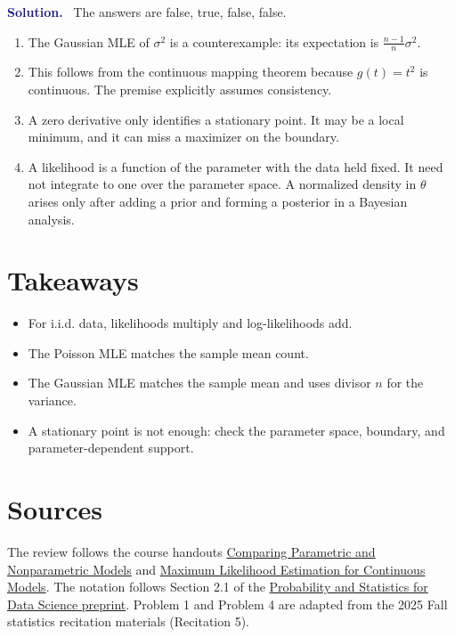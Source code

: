 \documentclass[11pt]{article}
\newenvironment{answer}{%
    \par\medskip\noindent\textcolor{MidnightBlue}{\textbf{Solution.}}\ }
    {\par\medskip}
\begin{document}
\begin{answer}
The answers are false, true, false, false.
\begin{enumerate}[label=(\alph*),itemsep=0.35em]
  \item The Gaussian MLE of $\sigma^2$ is a counterexample: its expectation is
        $\frac{n-1}{n}\sigma^2$.
  \item This follows from the continuous mapping theorem because
        $g(t)=t^2$ is continuous. The premise explicitly assumes consistency.
  \item A zero derivative only identifies a stationary point. It may be a
        local minimum, and it can miss a maximizer on the boundary.
  \item A likelihood is a function of the parameter with the data held fixed.
        It need not integrate to one over the parameter space. A normalized
        density in $\theta$ arises only after adding a prior and forming a
        posterior in a Bayesian analysis.
\end{enumerate}
\end{answer}

\section*{Takeaways}
\begin{itemize}[leftmargin=1.6em,itemsep=0.25em]
  \item For i.i.d. data, likelihoods multiply and log-likelihoods add.
  \item The Poisson MLE matches the sample mean count.
  \item The Gaussian MLE matches the sample mean and uses divisor $n$ for the
        variance.
  \item A stationary point is not enough: check the parameter space, boundary,
        and parameter-dependent support.
\end{itemize}

\section*{Sources}
The review follows the course handouts
\href{https://github.com/cfgranda/ps4ds/blob/main/slides/discrete%20variables/parametric_vs_nonparametric_handout.pdf}{Comparing Parametric and Nonparametric Models}
and
\href{https://github.com/cfgranda/ps4ds/blob/main/slides/continuous%20variables/maximum_likelihood_continuous_models_handout.pdf}{Maximum Likelihood Estimation for Continuous Models}.
The notation follows Section 2.1 of the
\href{https://github.com/cfgranda/ps4ds/blob/main/ps4ds_preprint.pdf}{Probability and Statistics for Data Science preprint}.
Problem 1 and Problem 4 are adapted from the 2025 Fall statistics recitation
materials (Recitation 5).
\end{document}
